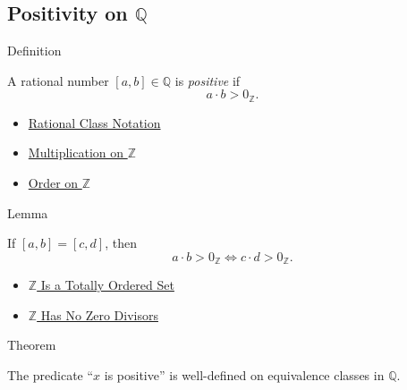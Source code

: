 \subsection*{Positivity on $\mathbb{Q}$}

\begin{definitionbox}{Definition}
\begin{definition}
\label{def:positive-rational}
A rational number $[a,b]\in\mathbb{Q}$ is \emph{positive} if
\[
a\cdot b>0_{\mathbb{Z}}.
\]
\end{definition}
\end{definitionbox}

\begin{dependencies}
\begin{itemize}
  \item \hyperref[def:rational-class-notation]{Rational Class Notation}
  \item \hyperref[def:multiplication-on-z-classes]{Multiplication on $\mathbb{Z}$}
  \item \hyperref[def:order-on-z]{Order on $\mathbb{Z}$}
\end{itemize}
\end{dependencies}

\begin{lemmabox}{Lemma}
\begin{lemma}
\label{lem:positivity-respects-equivalence-q}
If $[a,b]=[c,d]$, then
\[
a\cdot b>0_{\mathbb{Z}}
\Longleftrightarrow
c\cdot d>0_{\mathbb{Z}}.
\]
\end{lemma}
\end{lemmabox}

\begin{dependencies}
\begin{itemize}
  \item \hyperref[thm:z-totally-ordered-set]{$\mathbb{Z}$ Is a Totally Ordered Set}
  \item \hyperref[thm:z-has-no-zero-divisors]{$\mathbb{Z}$ Has No Zero Divisors}
\end{itemize}
\end{dependencies}

\begin{theorembox}{Theorem}
\begin{theorem}
\label{thm:positivity-on-q-well-defined}
The predicate ``$x$ is positive'' is well-defined on equivalence classes in
$\mathbb{Q}$.
\end{theorem}
\end{theorembox}


